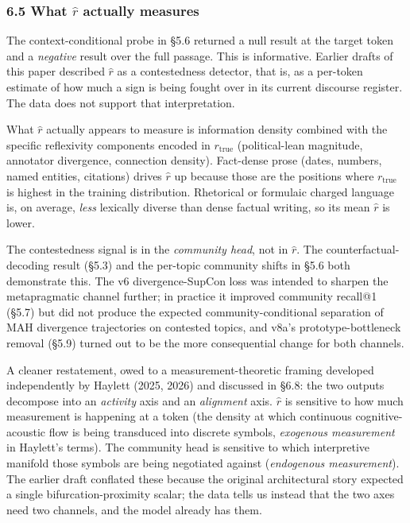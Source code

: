 \documentclass[
  11pt]{article}
\begin{document}
\subsubsection{\texorpdfstring{6.5 What \(\hat{r}\) actually
measures}{6.5 What \textbackslash hat\{r\} actually measures}}\label{what-hatr-actually-measures}

The context-conditional probe in §5.6 returned a null result at the
target token and a \emph{negative} result over the full passage. This is
informative. Earlier drafts of this paper described \(\hat{r}\) as a
contestedness detector, that is, as a per-token estimate of how much a
sign is being fought over in its current discourse register. The data
does not support that interpretation.

What \(\hat{r}\) actually appears to measure is information density
combined with the specific reflexivity components encoded in
\(r_{\text{true}}\) (political-lean magnitude, annotator divergence,
connection density). Fact-dense prose (dates, numbers, named entities,
citations) drives \(\hat{r}\) up because those are the positions where
\(r_{\text{true}}\) is highest in the training distribution. Rhetorical
or formulaic charged language is, on average, \emph{less} lexically
diverse than dense factual writing, so its mean \(\hat{r}\) is lower.

The contestedness signal is in the \emph{community head}, not in
\(\hat{r}\). The counterfactual-decoding result (§5.3) and the per-topic
community shifts in §5.6 both demonstrate this. The v6 divergence-SupCon
loss was intended to sharpen the metapragmatic channel further; in
practice it improved community recall@1 (§5.7) but did not produce the
expected community-conditional separation of MAH divergence trajectories
on contested topics, and v8a's prototype-bottleneck removal (§5.9)
turned out to be the more consequential change for both channels.

A cleaner restatement, owed to a measurement-theoretic framing developed
independently by Haylett (2025, 2026) and discussed in §6.8: the two
outputs decompose into an \emph{activity} axis and an \emph{alignment}
axis. \(\hat{r}\) is sensitive to how much measurement is happening at a
token (the density at which continuous cognitive-acoustic flow is being
transduced into discrete symbols, \emph{exogenous measurement} in
Haylett's terms). The community head is sensitive to which interpretive
manifold those symbols are being negotiated against (\emph{endogenous
measurement}). The earlier draft conflated these because the original
architectural story expected a single bifurcation-proximity scalar; the
data tells us instead that the two axes need two channels, and the model
already has them.
\end{document}
